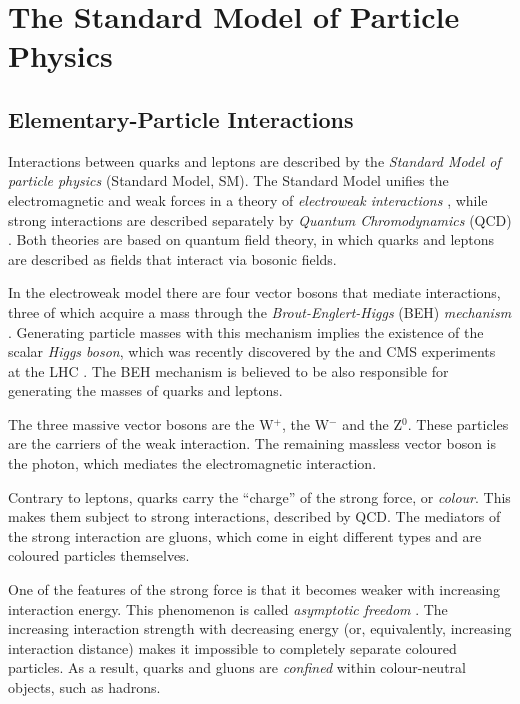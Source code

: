 \section{The Standard Model of Particle Physics}
\label{sec:intro_SM}

\subsection{Elementary-Particle Interactions}
\label{subsec:intro_SM_int}

Interactions between quarks and leptons are described by the \emph{Standard Model of particle physics} (Standard Model, SM). The Standard
Model unifies the electromagnetic and weak forces in a theory of \emph{electroweak interactions}
\cite{Glashow:1961tr,*Weinberg:1967tq,*Salam:1968rm}, while strong interactions are described separately by \emph{Quantum Chromodynamics}
(QCD) \cite{Fritzsch:1973pi}. Both theories are based on quantum field theory, in which quarks and leptons are described as fields that
interact via bosonic fields.

In the electroweak model there are four vector bosons that mediate interactions, three of which acquire a mass through the
\emph{Brout-Englert-Higgs} (BEH) \emph{mechanism} \cite{Englert:1964et,*Higgs:1964ia,*Higgs:1964pj,*Guralnik:1964eu}. Generating particle
masses with this mechanism implies the existence of the scalar \emph{Higgs boson}, which was recently discovered by the \atlas{} and
CMS experiments at the LHC \cite{Aad:2012tfa,*Chatrchyan:2012ufa}. The BEH mechanism is believed to be also responsible for generating the
masses of quarks and leptons.

The three massive vector bosons are the W$^+$, the W$^-$ and the Z$^0$. These particles are the carriers of the weak interaction. The
remaining massless vector boson is the photon, which mediates the electromagnetic interaction.

Contrary to leptons, quarks carry the ``charge'' of the strong force, or \emph{colour}. This makes them subject to strong interactions,
described by QCD. The mediators of the strong interaction are gluons, which come in eight different types and are coloured particles
themselves.

One of the features of the strong force is that it becomes weaker with increasing interaction energy. This phenomenon is called
\emph{asymptotic freedom} \cite{Gross:1973id,*Politzer:1973fx}. The increasing interaction strength with decreasing energy (or,
equivalently, increasing interaction distance) makes it impossible to completely separate coloured particles. As a result, quarks and
gluons are \emph{confined} within colour-neutral objects, such as hadrons.

